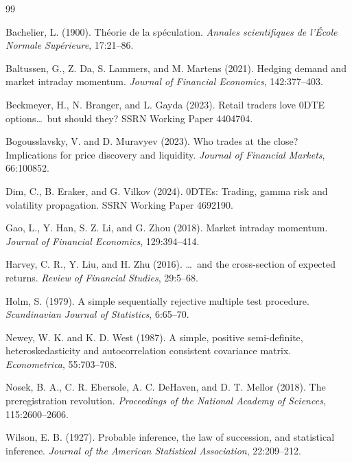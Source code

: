 \documentclass[12pt,letterpaper]{article}
\begin{document}
\begingroup
{}
\setlength{\bibsep}{6pt}
\begin{thebibliography}{99}

Bachelier, L. (1900). Th\'eorie de la sp\'eculation. \textit{Annales
scientifiques de l'\'Ecole Normale Sup\'erieure}, 17:21--86.

Baltussen, G., Z. Da, S. Lammers, and M. Martens (2021). Hedging demand and
market intraday momentum. \textit{Journal of Financial Economics}, 142:377--403.

Beckmeyer, H., N. Branger, and L. Gayda (2023). Retail traders love 0DTE
options\ldots\ but should they? SSRN Working Paper 4404704.

Bogousslavsky, V. and D. Muravyev (2023). Who trades at the close? Implications
for price discovery and liquidity. \textit{Journal of Financial Markets},
66:100852.

Dim, C., B. Eraker, and G. Vilkov (2024). 0DTEs: Trading, gamma risk and
volatility propagation. SSRN Working Paper 4692190.

Gao, L., Y. Han, S. Z. Li, and G. Zhou (2018). Market intraday momentum.
\textit{Journal of Financial Economics}, 129:394--414.

Harvey, C. R., Y. Liu, and H. Zhu (2016). \ldots\ and the cross-section of
expected returns. \textit{Review of Financial Studies}, 29:5--68.

Holm, S. (1979). A simple sequentially rejective multiple test procedure.
\textit{Scandinavian Journal of Statistics}, 6:65--70.

Newey, W. K. and K. D. West (1987). A simple, positive semi-definite,
heteroskedasticity and autocorrelation consistent covariance matrix.
\textit{Econometrica}, 55:703--708.

Nosek, B. A., C. R. Ebersole, A. C. DeHaven, and D. T. Mellor (2018). The
preregistration revolution. \textit{Proceedings of the National Academy of
Sciences}, 115:2600--2606.

Wilson, E. B. (1927). Probable inference, the law of succession, and statistical
inference. \textit{Journal of the American Statistical Association}, 22:209--212.

\end{thebibliography}
\endgroup
\end{document}
